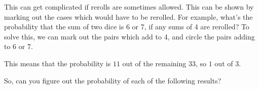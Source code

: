 \begin{puzzle}
\vfill

\newpage

This can get complicated if rerolls are sometimes allowed.
This can be shown by marking out the cases which would have to be rerolled.
For example, what's the probability that the sum of two dice is 6 or 7,
if any sums of 4 are rerolled? To solve this, we can mark
out the pairs which add to 4, and circle the pairs
adding to 6 or 7.

\vfill

\begin{center}\Huge
\end{center}
\begin{center}\Huge
\end{center}
\begin{center}\Huge
\end{center}
\begin{center}\Huge
\end{center}
\begin{center}\Huge
\end{center}
\begin{center}\Huge
\end{center}

\vfill

This means that the probability is \(11\) out
of the remaining \(33\), so \(1\) out of \(3\).

\vfill
\newpage

So, can you figure out the probability of each of the following results?


\end{puzzle}
